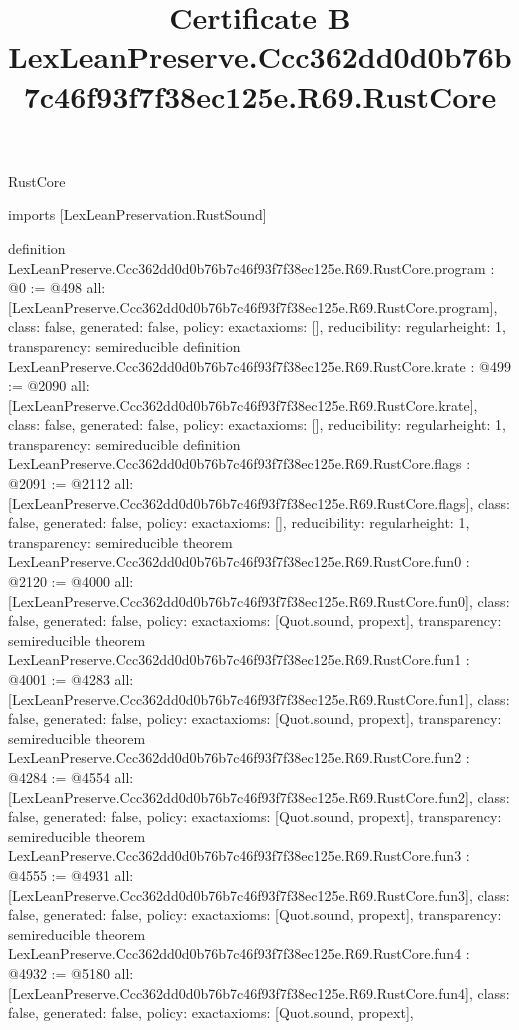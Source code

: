 \begin{lexlean}{RustCore}
\title{Certificate B LexLeanPreserve.Ccc362dd0d0b76b7c46f93f7f38ec125e.R69.RustCore}
\begin{coremodule}
imports [LexLeanPreservation.RustSound]

definition LexLeanPreserve.Ccc362dd0d0b76b7c46f93f7f38ec125e.R69.RustCore.program : @0 := @498 {
  all: [LexLeanPreserve.Ccc362dd0d0b76b7c46f93f7f38ec125e.R69.RustCore.program],
  class: false,
  generated: false,
  policy: exact{axioms: []},
  reducibility: regular{height: 1},
  transparency: semireducible
}
definition LexLeanPreserve.Ccc362dd0d0b76b7c46f93f7f38ec125e.R69.RustCore.krate : @499 := @2090 {
  all: [LexLeanPreserve.Ccc362dd0d0b76b7c46f93f7f38ec125e.R69.RustCore.krate],
  class: false,
  generated: false,
  policy: exact{axioms: []},
  reducibility: regular{height: 1},
  transparency: semireducible
}
definition LexLeanPreserve.Ccc362dd0d0b76b7c46f93f7f38ec125e.R69.RustCore.flags : @2091 := @2112 {
  all: [LexLeanPreserve.Ccc362dd0d0b76b7c46f93f7f38ec125e.R69.RustCore.flags],
  class: false,
  generated: false,
  policy: exact{axioms: []},
  reducibility: regular{height: 1},
  transparency: semireducible
}
theorem LexLeanPreserve.Ccc362dd0d0b76b7c46f93f7f38ec125e.R69.RustCore.fun0 : @2120 := @4000 {
  all: [LexLeanPreserve.Ccc362dd0d0b76b7c46f93f7f38ec125e.R69.RustCore.fun0],
  class: false,
  generated: false,
  policy: exact{axioms: [Quot.sound, propext]},
  transparency: semireducible
}
theorem LexLeanPreserve.Ccc362dd0d0b76b7c46f93f7f38ec125e.R69.RustCore.fun1 : @4001 := @4283 {
  all: [LexLeanPreserve.Ccc362dd0d0b76b7c46f93f7f38ec125e.R69.RustCore.fun1],
  class: false,
  generated: false,
  policy: exact{axioms: [Quot.sound, propext]},
  transparency: semireducible
}
theorem LexLeanPreserve.Ccc362dd0d0b76b7c46f93f7f38ec125e.R69.RustCore.fun2 : @4284 := @4554 {
  all: [LexLeanPreserve.Ccc362dd0d0b76b7c46f93f7f38ec125e.R69.RustCore.fun2],
  class: false,
  generated: false,
  policy: exact{axioms: [Quot.sound, propext]},
  transparency: semireducible
}
theorem LexLeanPreserve.Ccc362dd0d0b76b7c46f93f7f38ec125e.R69.RustCore.fun3 : @4555 := @4931 {
  all: [LexLeanPreserve.Ccc362dd0d0b76b7c46f93f7f38ec125e.R69.RustCore.fun3],
  class: false,
  generated: false,
  policy: exact{axioms: [Quot.sound, propext]},
  transparency: semireducible
}
theorem LexLeanPreserve.Ccc362dd0d0b76b7c46f93f7f38ec125e.R69.RustCore.fun4 : @4932 := @5180 {
  all: [LexLeanPreserve.Ccc362dd0d0b76b7c46f93f7f38ec125e.R69.RustCore.fun4],
  class: false,
  generated: false,
  policy: exact{axioms: [Quot.sound, propext]},
}
\end{coremodule}
\end{lexlean}
